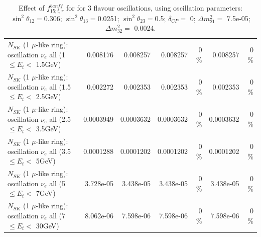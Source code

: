 \begin{table}
\begin{tabular}{| l | r | r | r  r | r  r |}
$N_{SK}$ (1 $\mu$-like ring): oscillation $\nu_{e}$ all (1 $\leq E_{t} <$ 1.5GeV) &        0.008176 &        0.008257 &        0.008257 &        0 \%  &        0.008257 &        0 \%  \\ 
$N_{SK}$ (1 $\mu$-like ring): oscillation $\nu_{e}$ all (1.5 $\leq E_{t} <$ 2.5GeV) &        0.002272 &        0.002353 &        0.002353 &        0 \%  &        0.002353 &        0 \%  \\ 
$N_{SK}$ (1 $\mu$-like ring): oscillation $\nu_{e}$ all (2.5 $\leq E_{t} <$ 3.5GeV) &       0.0003949 &       0.0003632 &       0.0003632 &        0 \%  &       0.0003632 &        0 \%  \\ 
$N_{SK}$ (1 $\mu$-like ring): oscillation $\nu_{e}$ all (3.5 $\leq E_{t} <$ 5GeV) &       0.0001288 &       0.0001202 &       0.0001202 &        0 \%  &       0.0001202 &        0 \%  \\ 
 $N_{SK}$ (1 $\mu$-like ring): oscillation $\nu_{e}$ all (5 $\leq E_{t} <$ 7GeV) &       3.728e-05 &       3.438e-05 &       3.438e-05 &        0 \%  &       3.438e-05 &        0 \%  \\ 
$N_{SK}$ (1 $\mu$-like ring): oscillation $\nu_{e}$ all (7 $\leq E_{t} <$ 30GeV) &       8.062e-06 &       7.598e-06 &       7.598e-06 &        0 \%  &       7.598e-06 &        0 \%  \\ 
\hline
\hline
\end{tabular}
\caption{ Effect of $f_{15; t, r}^{banff}$ for for 3 flavour oscillations, using oscillation parameters:  $\sin^2\theta_{12} = $0.306; $\sin^2\theta_{13} = $0.0251; $\sin^2\theta_{23} = $0.5; $\delta_{CP} = $        0; $\Delta m^2_{21} = $    7.5e-05; $\Delta m^2_{32} = $    0.0024. }
\label{tab:num_banff_15_1RmuT_3f_osc_t13:0.0251}
\end{table}
\clearpage
